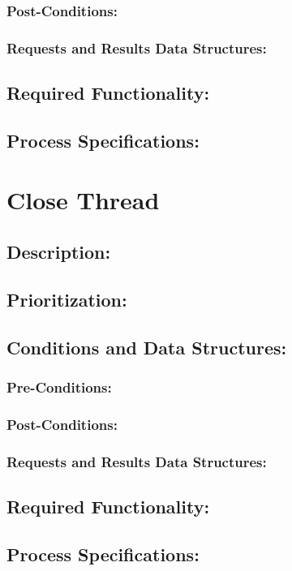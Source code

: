 \documentclass[a4paper,11pt]{article}
\begin{document}
\subsubsection*{Post-Conditions:}
\subsubsection*{Requests and Results Data Structures:}
\subsection{Required Functionality:} 
\subsection{Process Specifications:} 

\section{Close Thread}
\subsection*{Description:}
\subsection{Prioritization:} 
\subsection{Conditions and Data Structures:}
\subsubsection*{Pre-Conditions:}
\subsubsection*{Post-Conditions:}
\subsubsection*{Requests and Results Data Structures:}
\subsection{Required Functionality:} 
\subsection{Process Specifications:} 
\end{document}
